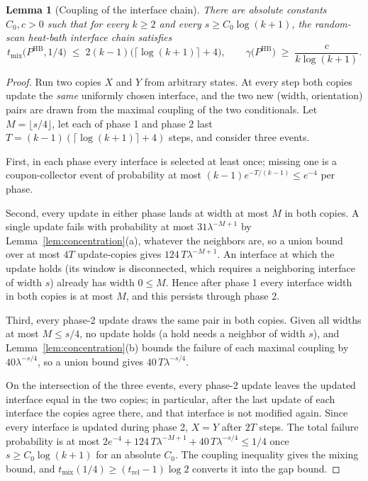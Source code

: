 \documentclass[11pt]{article}
\newtheorem{lemma}[theorem]{Lemma}
\begin{document}
\begin{lemma}[Coupling of the interface chain]
\label{lem:coupling}
There are absolute constants $C_0, c > 0$ such that for every $k \ge 2$
and every $s \ge C_0 \log(k+1)$, the random-scan heat-bath interface
chain satisfies
\[
  t_{\mathrm{mix}}\bigl(P^{\mathrm{HB}}, 1/4\bigr)
  \;\le\; 2(k-1)\bigl(\lceil \log(k+1) \rceil + 4\bigr),
  \qquad
  \gamma\bigl(P^{\mathrm{HB}}\bigr) \;\ge\; \frac{c}{k \log(k+1)} .
\]
\end{lemma}

\begin{proof}
Run two copies $X$ and $Y$ from arbitrary states. At every step both
copies update the \emph{same} uniformly chosen interface, and the two
new (width, orientation) pairs are drawn from the maximal coupling of
the two conditionals. Let $M = \lfloor s/4 \rfloor$, let each of phase 1
and phase 2 last $T = (k-1)(\lceil \log(k+1) \rceil + 4)$ steps, and
consider three events.

First, in each phase every interface is selected at least once; missing
one is a coupon-collector event of probability at most
$(k-1) e^{-T/(k-1)} \le e^{-4}$ per phase.

Second, every update in either phase lands at width at most $M$ in both
copies. A single update fails with probability at most
$31 \lambda^{-M + 1}$ by Lemma~\ref{lem:concentration}(a), whatever the
neighbors are, so a union bound over at most $4T$ update-copies gives
$124\, T \lambda^{-M + 1}$. An interface at which the update holds (its
window is disconnected, which requires a neighboring interface of width
$s$) already has width $0 \le M$. Hence after phase 1 every interface
width in both copies is at most $M$, and this persists through phase 2.

Third, every phase-2 update draws the same pair in both copies. Given
all widths at most $M \le s/4$, no update holds (a hold needs a neighbor
of width $s$), and Lemma~\ref{lem:concentration}(b) bounds the failure
of each maximal coupling by $40 \lambda^{-s/4}$, so a union bound gives
$40\, T \lambda^{-s/4}$.

On the intersection of the three events, every phase-2 update leaves the
updated interface equal in the two copies; in particular, after the last
update of each interface the copies agree there, and that interface is
not modified again. Since every interface is updated during phase 2,
$X = Y$ after $2T$ steps. The total failure probability is at most
$2 e^{-4} + 124\, T \lambda^{-M+1} + 40\, T \lambda^{-s/4} \le 1/4$
once $s \ge C_0 \log(k+1)$ for an absolute $C_0$. The coupling
inequality gives the mixing bound, and
$t_{\mathrm{mix}}(1/4) \ge (t_{\mathrm{rel}} - 1) \log 2$ converts it
into the gap bound.
\end{proof}
\end{document}

